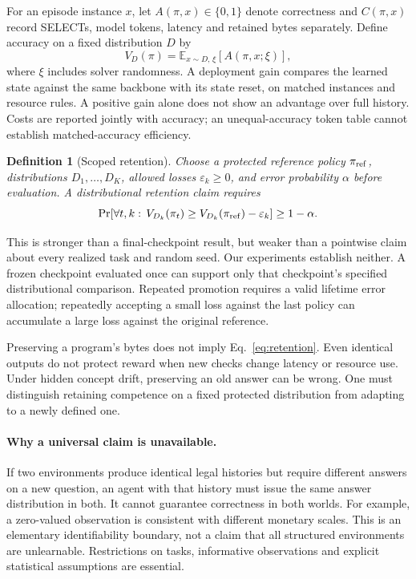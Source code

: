 \documentclass[10pt,twocolumn]{article}
\newtheorem{definition}{Definition}
\newcommand{\E}{\mathbb{E}}
\begin{document}
For an episode instance $x$, let $A(\pi,x)\in\{0,1\}$ denote correctness and
$C(\pi,x)$ record SELECTs, model tokens, latency and retained bytes separately.
Define accuracy on a fixed distribution $D$ by
\begin{equation}
 V_D(\pi)=\E_{x\sim D,\,\xi}[A(\pi,x;\xi)],
\end{equation}
where $\xi$ includes solver randomness. A deployment gain compares the learned
state against the same backbone with its state reset, on matched instances and
resource rules. A positive gain alone does not show an advantage over full
history. Costs are reported jointly with accuracy; an unequal-accuracy token
table cannot establish matched-accuracy efficiency.

\begin{definition}[Scoped retention]
Choose a protected reference policy $\pi_{\rm ref}$, distributions
$D_1,\ldots,D_K$, allowed losses $\varepsilon_k\geq0$, and error probability
$\alpha$ before evaluation. A distributional retention claim requires
\begin{equation}\label{eq:retention}
 \Pr\!\left[\forall t,k:\,
 V_{D_k}(\pi_t)\geq V_{D_k}(\pi_{\rm ref})-\varepsilon_k\right]
 \geq 1-\alpha.
\end{equation}
\end{definition}
This is stronger than a final-checkpoint result, but weaker than a pointwise
claim about every realized task and random seed. Our experiments establish
neither. A frozen checkpoint evaluated once can support only that checkpoint's
specified distributional comparison. Repeated promotion requires a valid
lifetime error allocation; repeatedly accepting a small loss against the last
policy can accumulate a large loss against the original reference.

Preserving a program's bytes does not imply Eq.~\eqref{eq:retention}. Even
identical outputs do not protect reward when new checks change latency or
resource use. Under hidden concept drift, preserving an old answer can be wrong.
One must distinguish retaining competence on a fixed protected distribution
from adapting to a newly defined one.

\paragraph{Why a universal claim is unavailable.}
If two environments produce identical legal histories but require different
answers on a new question, an agent with that history must issue the same
answer distribution in both. It cannot guarantee correctness in both worlds.
For example, a zero-valued observation is consistent with different monetary
scales. This is an elementary identifiability boundary, not a claim that all
structured environments are unlearnable. Restrictions on tasks, informative
observations and explicit statistical assumptions are essential.
\end{document}
